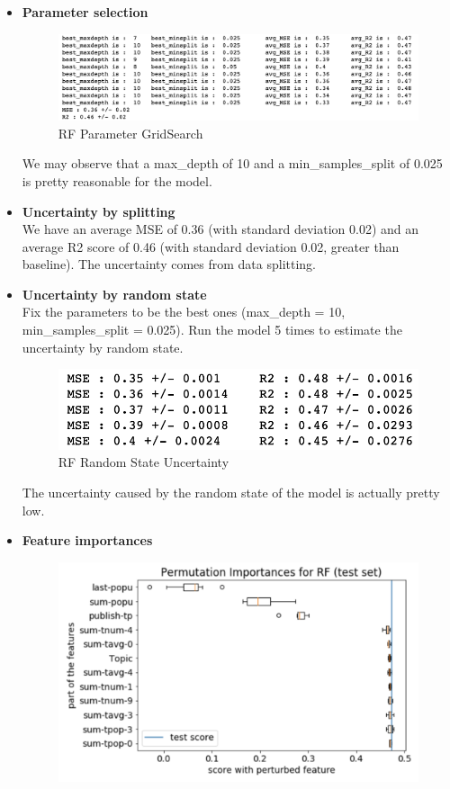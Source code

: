 \documentclass{article}
\begin{document}
\begin{itemize}
\item \textbf{Parameter selection}

\begin{figure}[H]
\centering
\includegraphics[scale=0.4]{"rforest_param"}
\caption{RF Parameter GridSearch}
\end{figure}

We may observe that a max\_depth of 10 and a min\_samples\_split of 0.025 is pretty reasonable for the model. 
\item \textbf{Uncertainty by splitting}\\
We have an average MSE of 0.36 (with standard deviation 0.02) and an average R2 score of 0.46 (with standard deviation 0.02, greater than baseline). The uncertainty comes from data splitting.
\item \textbf{Uncertainty by random state}\\
Fix the parameters to be the best ones (max\_depth = 10, min\_samples\_split = 0.025). Run the model 5 times to estimate the uncertainty by random state. 
\begin{figure}[H]
\centering
\includegraphics[scale=0.5]{"rf_rs_unc"}
\caption{RF Random State Uncertainty}
\end{figure}
The uncertainty caused by the random state of the model is actually pretty low.
\item \textbf{Feature importances}
\begin{figure}[H]
\centering
\includegraphics[scale=0.5]{"rf_perm_imp"}

\end{figure}
\end{itemize}
\end{document}
